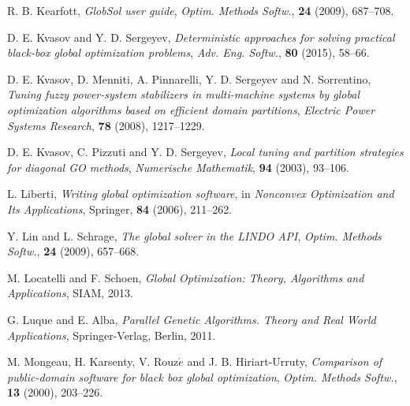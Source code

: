 \documentclass[runningheads]{llncs}
\begin{document}
\begin{thebibliography}{107}
\newblock R. B. Kearfott,
\newblock \emph{\emph{GlobSol user guide}},
\newblock \emph{Optim. Methods Softw.}, \textbf{24} (2009), 687--708.

\newblock D. E. Kvasov and Y. D. Sergeyev,
\newblock \emph{\emph{Deterministic approaches for solving practical black-box global optimization problems}},
\newblock \emph{Adv. Eng. Softw.}, \textbf{80} (2015), 58--66.

\newblock D. E. Kvasov, D. Menniti, A. Pinnarelli, Y. D. Sergeyev and N. Sorrentino,
\newblock \emph{\emph{Tuning fuzzy power-system stabilizers in multi-machine systems by global optimization algorithms based on
 efficient domain partitions}},
\newblock \emph{Electric Power Systems Research}, \textbf{78} (2008), 1217--1229.

\newblock D. E. Kvasov, C. Pizzuti and Y. D. Sergeyev,
\newblock \emph{\emph{Local tuning and partition strategies for diagonal GO methods}},
\newblock \emph{Numerische Mathematik}, \textbf{94} (2003), 93--106.

\newblock L. Liberti,
\newblock \emph{\emph{Writing global optimization software}},
\newblock in \emph{Nonconvex Optimization and Its Applications}, Springer, \textbf{84} (2006), 211--262.


\newblock Y. Lin and L. Schrage,
\newblock \emph{\emph{The global solver in the LINDO API}},
\newblock \emph{Optim. Methods Softw.}, \textbf{24} (2009), 657--668.

\newblock M. Locatelli and F. Schoen,
\newblock \emph{Global Optimization: Theory, Algorithms and Applications},
\newblock SIAM, 2013.

\newblock G. Luque and E. Alba,
\newblock \emph{Parallel Genetic Algorithms. Theory and Real World Applications},
\newblock Springer-Verlag, Berlin, 2011.

\newblock M. Mongeau, H. Karsenty, V. Rouz$\acute{e}$ and J. B. Hiriart-Urruty,
\newblock \emph{\emph{Comparison of public-domain software for black box global optimization}},
\newblock \emph{Optim. Methods Softw.}, \textbf{13} (2000), 203--226.


\end{thebibliography}
\end{document}

